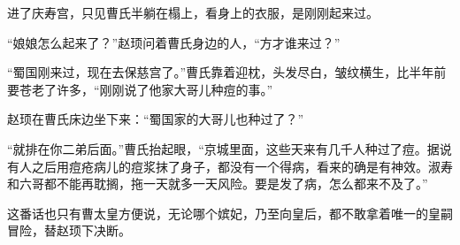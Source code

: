 进了庆寿宫，只见曹氏半躺在榻上，看身上的衣服，是刚刚起来过。

“娘娘怎么起来了？”赵顼问着曹氏身边的人，“方才谁来过？”

“蜀国刚来过，现在去保慈宫了。”曹氏靠着迎枕，头发尽白，皱纹横生，比半年前要苍老了许多，“刚刚说了他家大哥儿种痘的事。”

赵顼在曹氏床边坐下来：“蜀国家的大哥儿也种过了？”

“就排在你二弟后面。”曹氏抬起眼，“京城里面，这些天来有几千人种过了痘。据说有人之后用痘疮病儿的痘浆抹了身子，都没有一个得病，看来的确是有神效。淑寿和六哥都不能再耽搁，拖一天就多一天风险。要是发了病，怎么都来不及了。”

这番话也只有曹太皇方便说，无论哪个嫔妃，乃至向皇后，都不敢拿着唯一的皇嗣冒险，替赵顼下决断。

